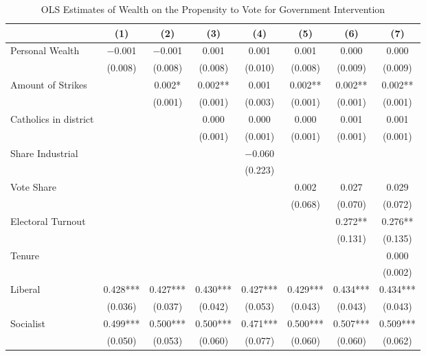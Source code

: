 \begin{table}

\caption{\label{tab:baseline_ols_govtint}OLS Estimates of Wealth on the Propensity to Vote for Government Intervention}
\centering
\begin{tabular}[t]{lccccccc}
\toprule
  & (1) & (2) & (3) & (4) & (5) & (6) & (7)\\
\midrule
Personal Wealth & \num{-0.001} & \num{-0.001} & \num{0.001} & \num{0.001} & \num{0.001} & \num{0.000} & \num{0.000}\\
 & (\num{0.008}) & (\num{0.008}) & (\num{0.008}) & (\num{0.010}) & (\num{0.008}) & (\num{0.009}) & (\num{0.009})\\
Amount of Strikes &  & \num{0.002}* & \num{0.002}** & \num{0.001} & \num{0.002}** & \num{0.002}** & \num{0.002}**\\
 &  & (\num{0.001}) & (\num{0.001}) & (\num{0.003}) & (\num{0.001}) & (\num{0.001}) & (\num{0.001})\\
Catholics in district &  &  & \num{0.000} & \num{0.000} & \num{0.000} & \num{0.001} & \num{0.001}\\
 &  &  & (\num{0.001}) & (\num{0.001}) & (\num{0.001}) & (\num{0.001}) & (\num{0.001})\\
Share Industrial &  &  &  & \num{-0.060} &  &  & \\
 &  &  &  & (\num{0.223}) &  &  & \\
Vote Share &  &  &  &  & \num{0.002} & \num{0.027} & \num{0.029}\\
 &  &  &  &  & (\num{0.068}) & (\num{0.070}) & (\num{0.072})\\
Electoral Turnout &  &  &  &  &  & \num{0.272}** & \num{0.276}**\\
 &  &  &  &  &  & (\num{0.131}) & (\num{0.135})\\
Tenure &  &  &  &  &  &  & \num{0.000}\\
 &  &  &  &  &  &  & (\num{0.002})\\
Liberal & \num{0.428}*** & \num{0.427}*** & \num{0.430}*** & \num{0.427}*** & \num{0.429}*** & \num{0.434}*** & \num{0.434}***\\
 & (\num{0.036}) & (\num{0.037}) & (\num{0.042}) & (\num{0.053}) & (\num{0.043}) & (\num{0.043}) & (\num{0.043})\\
Socialist & \num{0.499}*** & \num{0.500}*** & \num{0.500}*** & \num{0.471}*** & \num{0.500}*** & \num{0.507}*** & \num{0.509}***\\
 & (\num{0.050}) & (\num{0.053}) & (\num{0.060}) & (\num{0.077}) & (\num{0.060}) & (\num{0.060}) & (\num{0.062})\\

\end{tabular}
\end{table}
